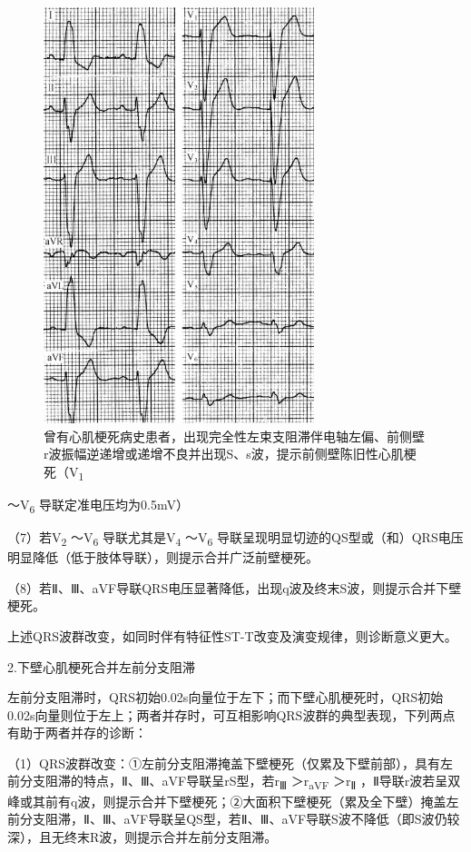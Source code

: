 \begin{figure}[!htbp]
 \centering
 \includegraphics[width=3.10417in,height=4.77083in]{./images/Image00723.jpg}
 \captionsetup{justification=centering}
 \caption{曾有心肌梗死病史患者，出现完全性左束支阻滞伴电轴左偏、前侧壁r波振幅逆递增或递增不良并出现S、s波，提示前侧壁陈旧性心肌梗死（V\textsubscript{1}}
 \label{fig44-15}
  \end{figure} 
～V\textsubscript{6} 导联定准电压均为0.5mV）

（7）若V\textsubscript{2} ～V\textsubscript{6}
导联尤其是V\textsubscript{4} ～V\textsubscript{6}
导联呈现明显切迹的QS型或（和）QRS电压明显降低（低于肢体导联），则提示合并广泛前壁梗死。

（8）若Ⅱ、Ⅲ、aVF导联QRS电压显著降低，出现q波及终末S波，则提示合并下壁梗死。

上述QRS波群改变，如同时伴有特征性ST-T改变及演变规律，则诊断意义更大。

2.下壁心肌梗死合并左前分支阻滞

左前分支阻滞时，QRS初始0.02s向量位于左下；而下壁心肌梗死时，QRS初始0.02s向量则位于左上；两者并存时，可互相影响QRS波群的典型表现，下列两点有助于两者并存的诊断：

（1）QRS波群改变：①左前分支阻滞掩盖下壁梗死（仅累及下壁前部），具有左前分支阻滞的特点，Ⅱ、Ⅲ、aVF导联呈rS型，若r\textsubscript{Ⅲ}
＞r\textsubscript{aVF} ＞r\textsubscript{Ⅱ}
，Ⅱ导联r波若呈双峰或其前有q波，则提示合并下壁梗死；②大面积下壁梗死（累及全下壁）掩盖左前分支阻滞，Ⅱ、Ⅲ、aVF导联呈QS型，若Ⅱ、Ⅲ、aVF导联S波不降低（即S波仍较深），且无终末R波，则提示合并左前分支阻滞。


